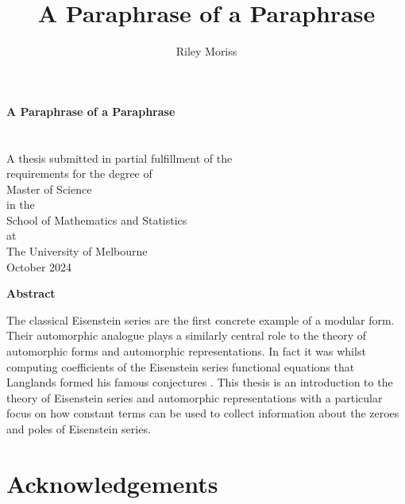\documentclass[10pt, openany]{book}
\title{A Paraphrase of a Paraphrase}
\author{Riley Moriss}
\numberwithin{equation}{section}
\begin{document}
	\begin{titlepage}
		\begin{center}
			\vspace*{1cm}
			\huge
			\textbf{A Paraphrase of a Paraphrase}\\
			\vspace{2cm}
			\Large
			\\
			\vspace{0.5cm}
			\\    
			
			A thesis submitted in partial fulfillment of the\\
			requirements for the degree of\\
			Master of Science\\
			in the\\
			School of Mathematics and Statistics\\
			at\\
			The University of Melbourne\\
			\vspace{1,5cm}
			October 2024
		\end{center}
	\end{titlepage}
	
	\pagebreak


\begin{center}
	\textbf{Abstract}
\end{center}

The classical Eisenstein series are the first concrete example of a modular form. Their automorphic analogue plays a similarly central role to the theory of automorphic forms and automorphic representations. In fact it was whilst computing coefficients of the Eisenstein series functional equations that Langlands formed his famous conjectures \cite[Ch VI. Funktorialität in der Theorie der automorphen Formen, Sec. 5 Wieder Princeton]{dumbaughEmilArtinClass2015}. This thesis is an introduction to the theory of Eisenstein series and automorphic representations with a particular focus on how constant terms can be used to collect information about the zeroes and poles of Eisenstein series. 



\chapter*{Acknowledgements}

\end{document}
